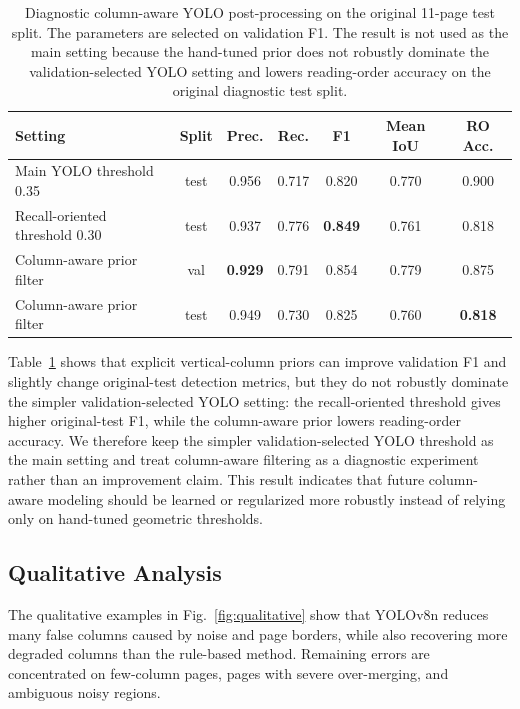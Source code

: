 \documentclass[12pt]{article}
\begin{document}
\begin{table}[t]
\centering
\scriptsize\setlength{\tabcolsep}{3pt}
\caption{Diagnostic column-aware YOLO post-processing on the original 11-page test split. The parameters are selected on validation F1. The result is not used as the main setting because the hand-tuned prior does not robustly dominate the validation-selected YOLO setting and lowers reading-order accuracy on the original diagnostic test split.}
\label{tab:column_aware_diag}
\begin{tabular}{lcccccc}
\toprule
Setting & Split & Prec. & Rec. & F1 & Mean IoU & RO Acc. \\
\midrule
Main YOLO threshold 0.35 & test & 0.956 & 0.717 & 0.820 & 0.770 & 0.900 \\
Recall-oriented threshold 0.30 & test & 0.937 & 0.776 & \textbf{0.849} & 0.761 & 0.818 \\
Column-aware prior filter & val & \textbf{0.929} & 0.791 & 0.854 & 0.779 & 0.875 \\
Column-aware prior filter & test & 0.949 & 0.730 & 0.825 & 0.760 & \textbf{0.818} \\
\bottomrule
\end{tabular}
\end{table}

Table~\ref{tab:column_aware_diag} shows that explicit vertical-column priors can improve validation F1 and slightly change original-test detection metrics, but they do not robustly dominate the simpler validation-selected YOLO setting: the recall-oriented threshold gives higher original-test F1, while the column-aware prior lowers reading-order accuracy. We therefore keep the simpler validation-selected YOLO threshold as the main setting and treat column-aware filtering as a diagnostic experiment rather than an improvement claim. This result indicates that future column-aware modeling should be learned or regularized more robustly instead of relying only on hand-tuned geometric thresholds.

\subsection{Qualitative Analysis}
The qualitative examples in Fig.~\ref{fig:qualitative} show that YOLOv8n reduces many false columns caused by noise and page borders, while also recovering more degraded columns than the rule-based method. Remaining errors are concentrated on few-column pages, pages with severe over-merging, and ambiguous noisy regions.
\end{document}
